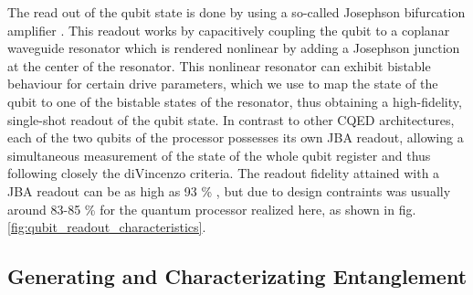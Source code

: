 The read out of the qubit state is done by using a so-called Josephson bifurcation amplifier \citep{siddiqi_dispersive_2006,mallet_single-shot_2009}. This readout works by capacitively coupling the qubit to a coplanar waveguide resonator which is rendered nonlinear by adding a Josephson junction at the center of the resonator. This nonlinear resonator can exhibit bistable behaviour for certain drive parameters, which we use to map the state of the qubit to one of the bistable states of the resonator, thus obtaining a high-fidelity, single-shot readout of the qubit state. In contrast to other CQED architectures, each of the two qubits of the processor possesses its own JBA readout, allowing a simultaneous measurement of the state of the whole qubit register and thus following closely the diVincenzo criteria. The readout fidelity attained with a JBA readout can be as high as 93 \% \citep{mallet_single-shot_2009}, but due to design contraints was usually around 83-85 \% for the quantum processor realized here, as shown in fig. \ref{fig:qubit_readout_characteristics}.

\subsection{Generating and Characterizating Entanglement}

